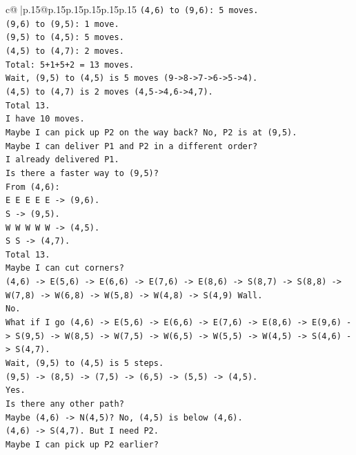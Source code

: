 \documentclass{article}
\begin{document}
{\begin{supertabular}{c@{$\;$}|p{.15\linewidth}@{}p{.15\linewidth}p{.15\linewidth}p{.15\linewidth}p{.15\linewidth}p{.15\linewidth}}
{{{\texttt{(4,6) to (9,6): 5 moves.} \\
\texttt{(9,6) to (9,5): 1 move.} \\
\texttt{(9,5) to (4,5): 5 moves.} \\
\texttt{(4,5) to (4,7): 2 moves.} \\
\texttt{Total: 5+1+5+2 = 13 moves.} \\
\texttt{Wait, (9,5) to (4,5) is 5 moves (9{-}>8{-}>7{-}>6{-}>5{-}>4).} \\
\texttt{(4,5) to (4,7) is 2 moves (4,5{-}>4,6{-}>4,7).} \\
\texttt{Total 13.} \\
\texttt{I have 10 moves.} \\
\texttt{Maybe I can pick up P2 on the way back? No, P2 is at (9,5).} \\
\texttt{Maybe I can deliver P1 and P2 in a different order?} \\
\texttt{I already delivered P1.} \\
\texttt{Is there a faster way to (9,5)?} \\
\texttt{From (4,6):} \\
\texttt{E E E E E {-}> (9,6).} \\
\texttt{S {-}> (9,5).} \\
\texttt{W W W W W {-}> (4,5).} \\
\texttt{S S {-}> (4,7).} \\
\texttt{Total 13.} \\
\texttt{Maybe I can cut corners?} \\
\texttt{(4,6) {-}> E(5,6) {-}> E(6,6) {-}> E(7,6) {-}> E(8,6) {-}> S(8,7) {-}> S(8,8) {-}> W(7,8) {-}> W(6,8) {-}> W(5,8) {-}> W(4,8) {-}> S(4,9) Wall.} \\
\texttt{No.} \\
\texttt{What if I go (4,6) {-}> E(5,6) {-}> E(6,6) {-}> E(7,6) {-}> E(8,6) {-}> E(9,6) {-}> S(9,5) {-}> W(8,5) {-}> W(7,5) {-}> W(6,5) {-}> W(5,5) {-}> W(4,5) {-}> S(4,6) {-}> S(4,7).} \\
\texttt{Wait, (9,5) to (4,5) is 5 steps.} \\
\texttt{(9,5) {-}> (8,5) {-}> (7,5) {-}> (6,5) {-}> (5,5) {-}> (4,5).} \\
\texttt{Yes.} \\
\texttt{Is there any other path?} \\
\texttt{Maybe (4,6) {-}> N(4,5)? No, (4,5) is below (4,6).} \\
\texttt{(4,6) {-}> S(4,7). But I need P2.} \\
\texttt{Maybe I can pick up P2 earlier?} \\
}}}
\end{supertabular}}
\end{document}
